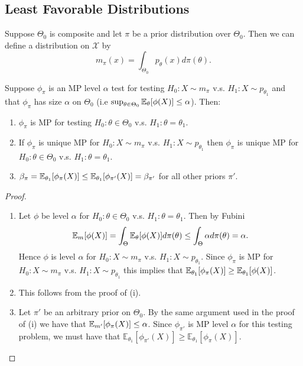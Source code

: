 \subsection{Least Favorable Distributions}

Suppose $\Theta_0$ is composite and let $\pi$ be a prior distribution over $\Theta_0$. Then we can define a distribution on $\mathcal {X}$ by \[
	m_\pi(x) = \int_{\Theta_0} p_\theta(x) d\pi(\theta).
\]

\begin{theorem}
	Suppose $\phi_\pi$ is an MP level $\alpha$ test for testing $H_0 : X \sim m_\pi$ v.s. $H_1 : X \sim p_{\theta_1}$ and that $\phi_\pi$ has size $\alpha$ on $\Theta_0$ (i.e $\sup_{\theta \in \Theta_0} \mathbb{E}_{\theta}[\phi(X)] \leq \alpha$). Then:
	
	\begin{enumerate}
		\item[(i)] $\phi_\pi$ is MP for testing $H_0 : \theta \in \Theta_0$ v.s. $H_1 : \theta = \theta_1$.
		
		\item[(ii)] If $\phi_\pi$ is unique MP for $H_0 : X \sim m_\pi$ v.s. $H_1 : X \sim p_{\theta_1}$ then $\phi_\pi$ is unique MP for $H_0 : \theta \in \Theta_0$ v.s. $H_1 : \theta = \theta_1$.
		
		\item[(iii)] $\beta_\pi = \mathbb{E}_{\theta_1}[\phi_\pi(X)] \le \mathbb{E}_{\theta_1}[\phi_{\pi'}(X)] = \beta_{\pi'}$ for all other priors $\pi'$.
 	\end{enumerate}
\end{theorem}

\begin{proof}
	\phantom{ }
	\begin{enumerate}
		\item[(i)] Let $\phi$ be level $\alpha$ for $H_0 : \theta \in \Theta_0$ v.s. $H_1 : \theta = \theta_1$. Then by Fubini \[
			\mathbb{E}_m[\phi(X)] = \int_{\Theta} \mathbb{E}_\theta[\phi(X)] d\pi(\theta) \leq \int_{\Theta} \alpha d\pi(\theta) = \alpha.
		\] Hence $\phi$ is level $\alpha$ for $H_0 : X \sim m_\pi$ v.s. $H_1 : X \sim p_{\theta_1}$. Since $\phi_\pi$ is MP for $H_0 : X \sim m_\pi$ v.s. $H_1 : X \sim p_{\theta_1}$ this implies that $\mathbb{E}_{\theta_1}[\phi_\pi(X)] \geq \mathbb{E}_{\theta_1}[\phi(X)]$.
		
		\item[(ii)] This follows from the proof of (i). 
		
		\item[(iii)] Let $\pi'$ be an arbitrary prior on $\Theta_0$. By the same argument used in the proof of (i) we have that $\mathbb{E}_{m'}[\phi_\pi(X)] \leq \alpha$.  Since $\phi_{\pi'}$ is MP level $\alpha$ for this testing problem, we must have that  $\mathbb{E}_{\theta_{1}}[\phi_{\pi'}(X)] \ge \mathbb{E}_{\theta_{1}} [\phi_{\pi}(X)]$. \qedhere
	\end{enumerate}
	
\end{proof}


